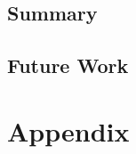 \documentclass[11pt,titlepage,oneside,openany]{book}
\begin{document}
\section{Summary}
\label{sec:sum}

\section{Future Work}
\label{sec:future}





\appendix

\chapter{Appendix}
\label{cha:appendix-a}

\newpage


\pagestyle{empty}
\end{document}
